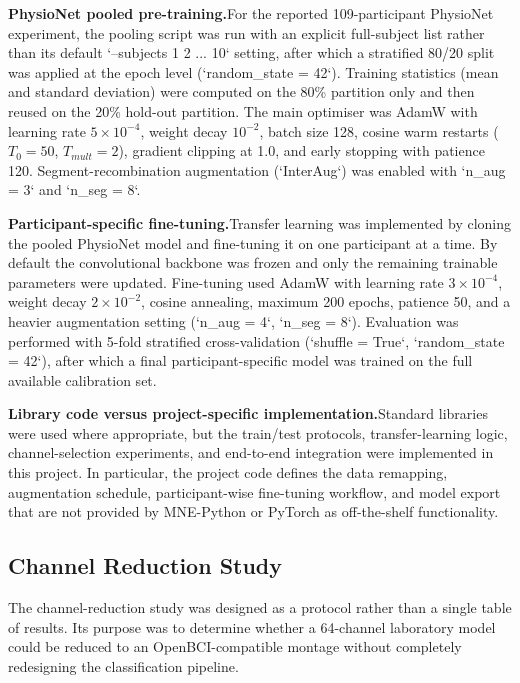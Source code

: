 \documentclass[12pt, a4paper]{article}
\begin{document}
\textbf{PhysioNet pooled pre-training.}\quad For the reported 109-participant PhysioNet experiment, the pooling script was run with an explicit full-subject list rather than its default `--subjects 1 2 ... 10` setting, after which a stratified 80/20 split was applied at the epoch level (`random\_state = 42`). Training statistics (mean and standard deviation) were computed on the 80\% partition only and then reused on the 20\% hold-out partition. The main optimiser was AdamW with learning rate $5 \times 10^{-4}$, weight decay $10^{-2}$, batch size 128, cosine warm restarts ($T_0 = 50$, $T_{mult} = 2$), gradient clipping at 1.0, and early stopping with patience 120. Segment-recombination augmentation (`InterAug`) was enabled with `n\_aug = 3` and `n\_seg = 8`.

\textbf{Participant-specific fine-tuning.}\quad Transfer learning was implemented by cloning the pooled PhysioNet model and fine-tuning it on one participant at a time. By default the convolutional backbone was frozen and only the remaining trainable parameters were updated. Fine-tuning used AdamW with learning rate $3 \times 10^{-4}$, weight decay $2 \times 10^{-2}$, cosine annealing, maximum 200 epochs, patience 50, and a heavier augmentation setting (`n\_aug = 4`, `n\_seg = 8`). Evaluation was performed with 5-fold stratified cross-validation (`shuffle = True`, `random\_state = 42`), after which a final participant-specific model was trained on the full available calibration set.

\textbf{Library code versus project-specific implementation.}\quad Standard libraries were used where appropriate, but the train/test protocols, transfer-learning logic, channel-selection experiments, and end-to-end integration were implemented in this project. In particular, the project code defines the data remapping, augmentation schedule, participant-wise fine-tuning workflow, and model export that are not provided by MNE-Python or PyTorch as off-the-shelf functionality.

\subsection{Channel Reduction Study}

The channel-reduction study was designed as a protocol rather than a single table of results. Its purpose was to determine whether a 64-channel laboratory model could be reduced to an OpenBCI-compatible montage without completely redesigning the classification pipeline.
\end{document}
